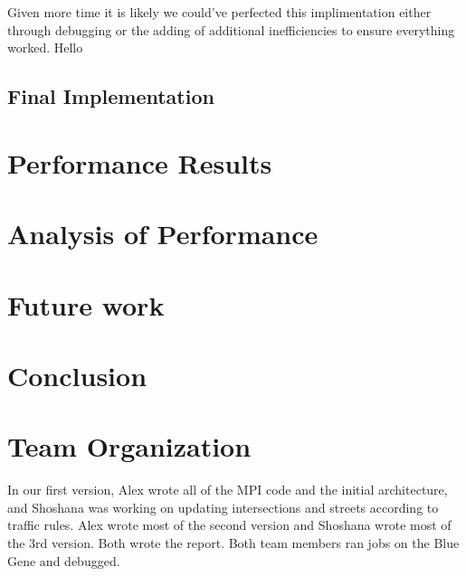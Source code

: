 \documentclass[10pt,a4paper]{article}
\begin{document}
Given more time it is likely we could've perfected this implimentation either through debugging or the adding of additional inefficiencies to ensure everything worked. Hello




\subsection{Final Implementation}



\section{Performance Results}

\section{Analysis of Performance}

\section{Future work}


\section{Conclusion}

\section{Team Organization}

In our first version, Alex wrote all of the MPI code and the initial architecture, and Shoshana was working on updating intersections and streets according to traffic rules. Alex wrote most of the second version and Shoshana wrote most of the 3rd version. Both wrote the report. Both team members ran jobs on the Blue Gene and debugged.





\end{document}
